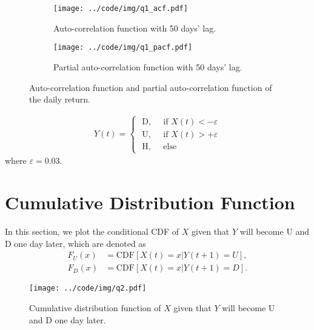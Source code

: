 \documentclass[runningheads]{llncs}
\begin{document}
\begin{figure}[!htbp]
    \begin{subfigure}[t]{0.49\textwidth}
        \centering
        \texttt{[image: ../code/img/q1\_acf.pdf]}
        \caption{Auto-correlation function with 50 days' lag.}
    \end{subfigure}
    \begin{subfigure}[t]{0.49\textwidth}
        \centering
        \texttt{[image: ../code/img/q1\_pacf.pdf]}
        \caption{Partial auto-correlation function with 50 days' lag.}
    \end{subfigure}
    \caption{Auto-correlation function and partial auto-correlation function of the daily return.}
    \label{fig:q1acf}
\end{figure}


\begin{align}
    Y(t)=\left\{
    \begin{array}{ll}
        \text { D, } & \text { if } X(t)<-\varepsilon \\
        \text { U, } & \text { if } X(t)>+\varepsilon \\
        \text { H, } & \text { else }
    \end{array}
    \right.
\end{align}
where $\varepsilon=0.03$.


\section{Cumulative Distribution Function}\label{sec:2}
In this section, we plot the conditional CDF of $X$ given that $Y$ will become U and D one day later, which are denoted as
\begin{align}
    F_U(x) & = \text{CDF}[X(t)=x|Y(t+1)=U], \\
    F_D(x) & = \text{CDF}[X(t)=x|Y(t+1)=D].
\end{align}



\begin{figure}[!htb]
    \begin{center}
        \texttt{[image: ../code/img/q2.pdf]}
    \end{center}
    \caption{ Cumulative distribution function of $X$ given that $Y$ will become U and D one day later.}
    \label{fig:q2}
\end{figure}
\end{document}
